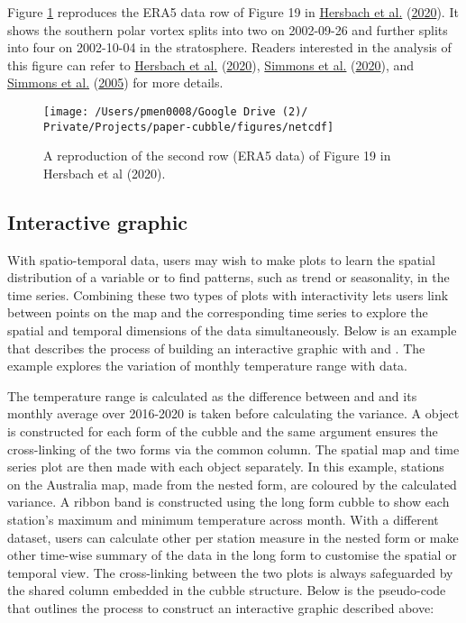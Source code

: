 \documentclass{article}
\begin{document}
Figure \ref{fig:netcdf} reproduces the ERA5 data row of Figure 19 in \protect\hyperlink{ref-hersbach2020era5}{Hersbach et al.} (\protect\hyperlink{ref-hersbach2020era5}{2020}). It shows the southern polar vortex splits into two on 2002-09-26 and further splits into four on 2002-10-04 in the stratosphere. Readers interested in the analysis of this figure can refer to \protect\hyperlink{ref-hersbach2020era5}{Hersbach et al.} (\protect\hyperlink{ref-hersbach2020era5}{2020}), \protect\hyperlink{ref-simmons2020global}{Simmons et al.} (\protect\hyperlink{ref-simmons2020global}{2020}), and \protect\hyperlink{ref-simmons2005ecmwf}{Simmons et al.} (\protect\hyperlink{ref-simmons2005ecmwf}{2005}) for more details.

\begin{figure}
\texttt{[image: /Users/pmen0008/Google Drive (2)/ Private/Projects/paper-cubble/figures/netcdf]} \caption{A reproduction of the second row (ERA5 data) of Figure 19 in Hersbach et al (2020).}\label{fig:netcdf}
\end{figure}

\hypertarget{interactive-graphic}{%
\subsection{Interactive graphic}\label{interactive-graphic}}

With spatio-temporal data, users may wish to make plots to learn the spatial distribution of a variable or to find patterns, such as trend or seasonality, in the time series. Combining these two types of plots with interactivity lets users link between points on the map and the corresponding time series to explore the spatial and temporal dimensions of the data simultaneously. Below is an example that describes the process of building an interactive graphic with  and . The example explores the variation of monthly temperature range with  data.

The temperature range is calculated as the difference between  and  and its monthly average over 2016-2020 is taken before calculating the variance. A  object is constructed for each form of the cubble and the same  argument ensures the cross-linking of the two forms via the common  column. The spatial map and time series plot are then made with each  object separately. In this example, stations on the Australia map, made from the nested form, are coloured by the calculated variance. A ribbon band is constructed using the long form cubble to show each station's maximum and minimum temperature across month. With a different dataset, users can calculate other per station measure in the nested form or make other time-wise summary of the data in the long form to customise the spatial or temporal view. The cross-linking between the two plots is always safeguarded by the shared  column embedded in the cubble structure. Below is the pseudo-code that outlines the process to construct an interactive graphic described above:
\end{document}
